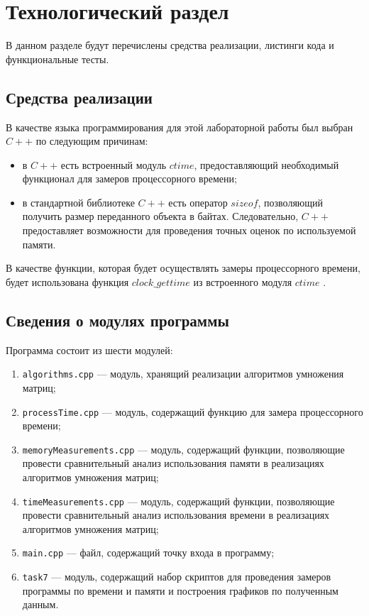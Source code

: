 \chapter{Технологический раздел}

В данном разделе будут перечислены средства реализации, листинги кода и функциональные тесты.

\section{Средства реализации}

В качестве языка программирования для этой лабораторной работы был выбран $C++$ \cite{pl} по следующим причинам:

\begin{itemize}[label=--]
	\item в $C++$ есть встроенный модуль $ctime$, предоставляющий необходимый функционал для замеров процессорного времени;
	\item в стандартной библиотеке $C++$ есть оператор $sizeof$, позволяющий получить размер переданного объекта в байтах. Следовательно, $C++$ предоставляет возможности для проведения точных оценок по используемой памяти.
\end{itemize}

В качестве функции, которая будет осуществлять замеры процессорного времени, будет использована функция $clock\_gettime$ из встроенного модуля $ctime$ \cite{cpu_time_func}.

\section{Сведения о модулях программы}

Программа состоит из шести модулей: 

\begin{enumerate}[label={\arabic*)}]
	\item \texttt{algorithms.cpp} --- модуль, хранящий реализации алгоритмов умножения матриц;
	\item \texttt{processTime.cpp} --- модуль, содержащий функцию для замера процессорного времени;
	\item \texttt{memoryMeasurements.cpp} --- модуль, содержащий функции, позволяющие провести сравнительный анализ использования памяти в реализациях алгоритмов умножения матриц;
	\item \texttt{timeMeasurements.cpp} --- модуль, содержащий функции, позволяющие провести сравнительный анализ использования времени в реализациях алгоритмов умножения матриц;
	\item \texttt{main.cpp} --- файл, содержащий точку входа в программу;
	\item \texttt{task7} --- модуль, содержащий набор скриптов для проведения замеров программы по времени и памяти и построения графиков по полученным данным.
\end{enumerate}

